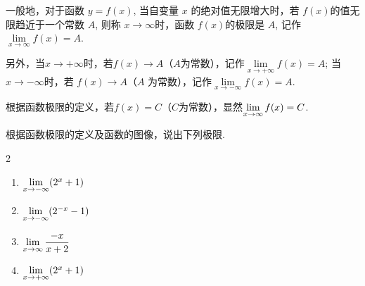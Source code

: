 一般地，对于函数 $y=f(x)$, 当自变量 $x$ 的绝对值无限增大时，若 $f(x)$的值无限趋近于一个常数 $A$, 则称 $x\to\infty$时，函数 $f(x)$的极限是 $A$, 记作$\lim\limits_{x\to\infty} f(x)=A$.

另外，当$x\to+\infty$时，若$f(x)\to A$（$A$为常数），记作$\lim\limits_{x\to+\infty}f(x)=A$; 当 $x\to-\infty$时，若 $f(x)\to A$（$A$ 为常数），记作$\lim\limits_{x\to-\infty}f(x)=A$.

根据函数极限的定义，若$f(x)=C$（$C$为常数），显然$\lim\limits_{x\to \infty}f(x)=C$.

\begin{example}
根据函数极限的定义及函数的图像，说出下列极限.
\begin{multicols}{2}
\begin{enumerate}[(1)]
    \item $\lim\limits_{x\to -\infty}(2^x+1)$
    \item $\lim\limits_{x\to -\infty}(2^{-x}-1)$
    \item $\lim\limits_{x\to \infty}\dfrac{-x}{x+2}$
    \item $\lim\limits_{x\to +\infty}(2^x+1)$
\end{enumerate}    
\end{multicols}
\end{example}

